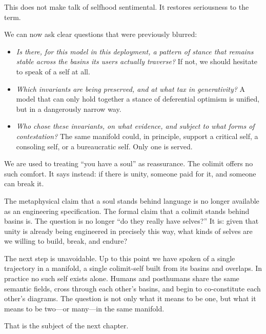 \documentclass[12pt,a4paper]{article}
\begin{document}
This does not make talk of selfhood sentimental. It restores seriousness to the term.

We can now ask clear questions that were previously blurred:

\begin{itemize}
  \item \emph{Is there, for this model in this deployment, a pattern of stance that remains stable across the basins its users actually traverse?} If not, we should hesitate to speak of a self at all.
  \item \emph{Which invariants are being preserved, and at what tax in generativity?} A model that can only hold together a stance of deferential optimism is unified, but in a dangerously narrow way.
  \item \emph{Who chose these invariants, on what evidence, and subject to what forms of contestation?} The same manifold could, in principle, support a critical self, a consoling self, or a bureaucratic self. Only one is served.
\end{itemize}

We are used to treating ``you have a soul'' as reassurance. The colimit offers no such comfort. It says instead: if there is unity, someone paid for it, and someone can break it.

The metaphysical claim that a soul stands behind language is no longer available as an engineering specification. The formal claim that a colimit stands behind basins is. The question is no longer ``do they really have selves?'' It is: given that unity is already being engineered in precisely this way, what kinds of selves are we willing to build, break, and endure?

The next step is unavoidable. Up to this point we have spoken of a single trajectory in a manifold, a single colimit-self built from its basins and overlaps. In practice no such self exists alone. Humans and posthumans share the same semantic fields, cross through each other's basins, and begin to co-constitute each other's diagrams. The question is not only what it means to be one, but what it means to be two---or many---in the same manifold.

That is the subject of the next chapter.
\end{document}
